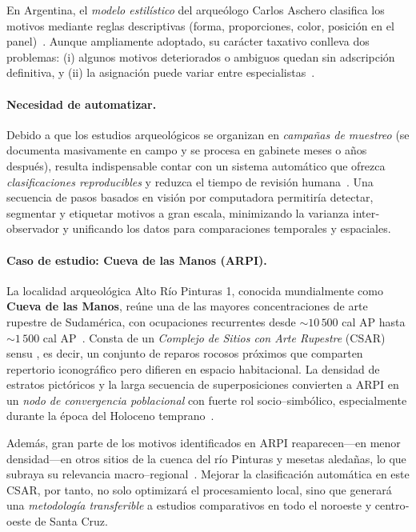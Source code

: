 En Argentina, el \emph{modelo estilístico} del arqueólogo Carlos Aschero clasifica los motivos mediante reglas descriptivas (forma, proporciones, color, posición en el panel)~\cite{aschero2000,aschero2012}.
Aunque ampliamente adoptado, su carácter taxativo conlleva dos problemas:
(i) algunos motivos deteriorados o ambiguos quedan sin adscripción definitiva, y
(ii) la asignación puede variar entre especialistas~\cite{aschero1998}.

\paragraph{Necesidad de automatizar.}
Debido a que los estudios arqueológicos se organizan en \emph{campañas de muestreo} (se documenta masivamente en campo y se procesa en gabinete meses o años después), resulta indispensable contar con un sistema automático que ofrezca \emph{clasificaciones reproducibles} y reduzca el tiempo de revisión humana~\cite{aschero1998}.
Una secuencia de pasos basados en visión por computadora permitiría detectar, segmentar y etiquetar motivos a gran escala, minimizando la varianza inter‐observador y unificando los datos para comparaciones temporales y espaciales.

\paragraph{Caso de estudio: Cueva de las Manos (ARPI).}
La localidad arqueológica Alto Río Pinturas 1, conocida mundialmente como \textbf{Cueva de las Manos}, reúne una de las mayores concentraciones de arte rupestre de Sudamérica, con ocupaciones recurrentes desde \(\sim10\,500\) cal AP hasta \(\sim1\,500\) cal AP~\cite{gradin1976}.
Consta de un \emph{Complejo de Sitios con Arte Rupestre} (CSAR) sensu \citet{aschero1996}, es decir, un conjunto de reparos rocosos próximos que comparten repertorio iconográfico pero difieren en espacio habitacional.
La densidad de estratos pictóricos y la larga secuencia de superposiciones convierten a ARPI en un \emph{nodo de convergencia poblacional} con fuerte rol socio–simbólico, especialmente durante la época del Holoceno temprano~\cite{gradin1987,aschero2021,aschero2023}.

Además, gran parte de los motivos identificados en ARPI reaparecen—en menor densidad—en otros sitios de la cuenca del río Pinturas y mesetas aledañas, lo que subraya su relevancia macro–regional~\cite{dincauze1987,dincauze2000}.
Mejorar la clasificación automática en este CSAR, por tanto, no solo optimizará el procesamiento local, sino que generará una \emph{metodología transferible} a estudios comparativos en todo el noroeste y centro‐oeste de Santa Cruz.

